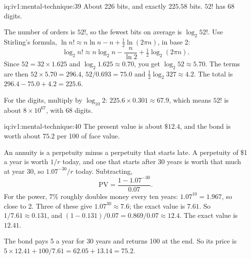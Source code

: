 \begin{solution}{iq:iv1:mental-technique:39}
About 226 bits, and exactly $225.58$ bits. $52!$ has 68 digits.

The number of orders is $52!$, so the fewest bits on average is $\log_2 52!$. Use Stirling's formula, $\ln n! \approx n \ln n - n + \tfrac12 \ln(2\pi n)$, in base 2:
\[
\log_2 n! \approx n \log_2 n - \frac{n}{\ln 2} + \tfrac12 \log_2 (2\pi n).
\]
Since $52 = 32 \times 1.625$ and $\log_2 1.625 \approx 0.70$, you get $\log_2 52 \approx 5.70$. The terms are then $52 \times 5.70 = 296.4$, $52/0.693 = 75.0$ and $\tfrac12 \log_2 327 \approx 4.2$. The total is $296.4 - 75.0 + 4.2 = 225.6$.

For the digits, multiply by $\log_{10} 2$: $225.6 \times 0.301 \approx 67.9$, which means $52!$ is about $8 \times 10^{67}$, with 68 digits.

\end{solution}

\begin{solution}{iq:iv1:mental-technique:40}
The present value is about $\$12.4$, and the bond is worth about $75.2$ per 100 of face value.

An annuity is a perpetuity minus a perpetuity that starts late. A perpetuity of \$1 a year is worth $1/r$ today, and one that starts after 30 years is worth that much at year 30, so $1.07^{-30}/r$ today. Subtracting,
\[
\text{PV} = \frac{1 - 1.07^{-30}}{0.07}.
\]
For the power, 7\% roughly doubles money every ten years: $1.07^{10} = 1.967$, so close to 2. Three of these give $1.07^{30} \approx 7.6$; the exact value is $7.61$. So $1/7.61 \approx 0.131$, and $(1 - 0.131)/0.07 = 0.869/0.07 \approx 12.4$. The exact value is $12.41$.

The bond pays 5 a year for 30 years and returns 100 at the end. So its price is $5 \times 12.41 + 100/7.61 = 62.05 + 13.14 = 75.2$.

\end{solution}
